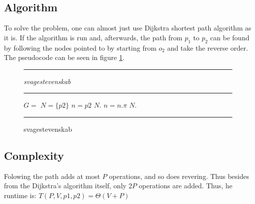 \subsection{Algorithm}

To solve the problem, one can almost just use Dijkstra
shortest path algorithm as it is. If the algorithm is run
and, afterwards, the path from $p_1$ to $p_2$ can be found
by following the nodes pointed to by starting from $o_2$ and 
take the reverse order. The pseudocode can 
be seen in figure \ref{fig:shortpathcode}.


\begin{figure}[ht!]
\hrule
\vspace{0.2cm}
{\centering  \textit{svagestevenskab}}
\vspace{0.2cm}
\hrule
\begin{algorithmic}
\State $G = $ 
\State {}
\State $N = \{p2\}$
\State $n = p2$
\State $N.$
\State $n = n.\pi$
\EndWhile
\State \Return $N.$
\EndFunction
\end{algorithmic}
\hrule
\caption{svagestevenskab  \label{fig:shortpathcode}}
\end{figure}

\subsection{Complexity}

Folowing the path adds at most $P$ operations, and so does revering.
Thus besides from the Dijkstra's algorithm itself, only $2P$ operations
are added. Thus, he runtime is: $T(P, V, p1, p2) = \Theta \left( V + P \right)$




